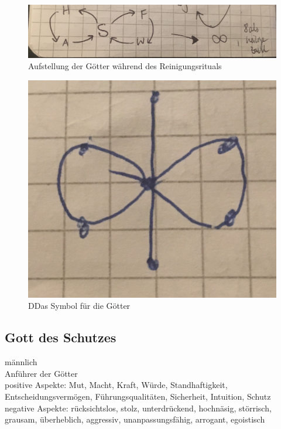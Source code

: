 \begin{figure}
	\centering
	\includegraphics[width=0.7\linewidth]{Abbildungen/Gesellschaft/GoetteraufstellungbeiReinigungsritual}
	\caption{Aufstellung der Götter während des Reinigungsrituals}
	\label{fig:goetteraufstellung}
\end{figure}

\begin{figure}
	\centering
	\includegraphics[width=0.3\textheight]{Abbildungen/Gesellschaft/Goettersymbol}
	\caption[Göttersymbol]{DDas Symbol für die Götter}
	\label{fig:goettersymbol}
\end{figure}


\subsection{Gott des Schutzes}
männlich\\
Anführer der Götter\\
positive Aspekte: Mut, Macht, Kraft, Würde, Standhaftigkeit, Entscheidungsvermögen, Führungsqualitäten, Sicherheit, Intuition, Schutz\\
negative Aspekte: rücksichtslos, stolz, unterdrückend, hochnäsig, störrisch, grausam, überheblich, aggressiv, unanpassungsfähig, arrogant, egoistisch

